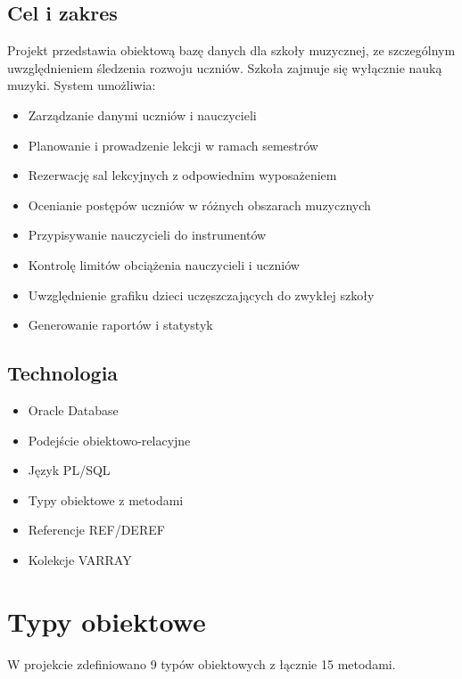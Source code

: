 \documentclass[12pt,a4paper]{article}
\begin{document}
\subsection{Cel i zakres}
Projekt przedstawia obiektową bazę danych dla szkoły muzycznej, ze szczególnym uwzględnieniem śledzenia rozwoju uczniów. Szkoła zajmuje się wyłącznie nauką muzyki. System umożliwia:
\begin{itemize}[nosep]
    \item Zarządzanie danymi uczniów i nauczycieli
    \item Planowanie i prowadzenie lekcji w ramach semestrów
    \item Rezerwację sal lekcyjnych z odpowiednim wyposażeniem
    \item Ocenianie postępów uczniów w różnych obszarach muzycznych
    \item Przypisywanie nauczycieli do instrumentów
    \item Kontrolę limitów obciążenia nauczycieli i uczniów
    \item Uwzględnienie grafiku dzieci uczęszczających do zwykłej szkoły
    \item Generowanie raportów i statystyk
\end{itemize}

\subsection{Technologia}
\begin{itemize}[nosep]
    \item Oracle Database
    \item Podejście obiektowo-relacyjne
    \item Język PL/SQL
    \item Typy obiektowe z metodami
    \item Referencje REF/DEREF
    \item Kolekcje VARRAY
\end{itemize}

\section{Typy obiektowe}

W projekcie zdefiniowano 9 typów obiektowych z łącznie 15 metodami.
\end{document}
